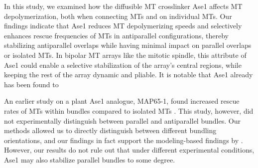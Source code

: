In this study, we examined how the diffusible MT crosslinker Ase1 affects MT depolymerization, both when connecting MTs and on individual MTs. Our findings indicate that Ase1 reduces MT depolymerizing speeds and selectively enhances rescue frequencies of MTs in antiparallel configurations, thereby stabilizing antiparallel overlaps while having minimal impact on parallel overlaps or isolated MTs. In bipolar MT arrays like the mitotic spindle, this attribute of Ase1 could enable a selective stabilization of the array's central regions, while keeping the rest of the array dynamic and pliable. It is notable that Ase1 already has been found to


An earlier study on a plant Ase1 analogue, MAP65-1, found increased rescue rates of MTs within bundles compared to isolated MTs \parencite{Stoppin-Mellet2013}. This study, however, did not experimentally distinguish between parallel and antiparallel bundles. Our methods allowed us to directly distinguish between different bundling orientations, and our findings in fact support the modeling-based findings by \parencite{Stoppin-Mellet2013}. However, our results do not rule out that under different experimental conditions, Ase1 may also stabilize parallel bundles to some degree.

